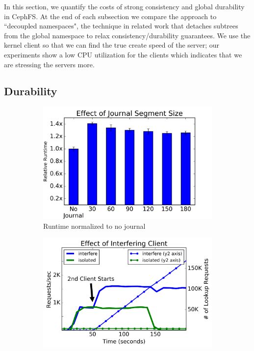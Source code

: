 In this section, we quantify the costs of strong consistency and global
durability in CephFS. At the end of each subsection we compare the approach to
``decoupled namespaces", the technique in related work that detaches subtrees
from the global namespace to relax consistency/durability guarantees.  We use
the kernel client so that we can find the true create speed of the server; our
experiments show a low CPU utilization for the clients which indicates that we
are stressing the servers more.

\subsection{Durability}
\label{sec:durability}

\begin{figure}[t]
  \centering
  \begin{subfigure}[b]{.3\linewidth}
      \centering
      \includegraphics[width=1.0\linewidth]{graphs/slowdown-journal.png}
      \caption{Runtime normalized to no journal} \label{fig:overhead-a}
  \end{subfigure}
  \begin{subfigure}[b]{.3\linewidth}
      \centering
      \includegraphics[width=1.0\linewidth]{graphs/behavior-interfere.png}

\end{subfigure}
\end{figure}
